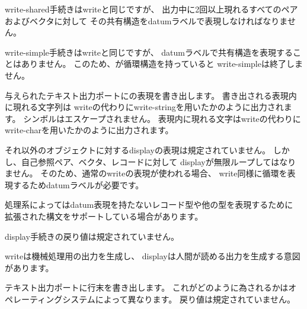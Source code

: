 \begin{entry}{%
}

{\cf write-shared}手続きは{\cf write}と同じですが、
出力中に2回以上現れるすべてのペアおよびベクタに対して
その共有構造をdatumラベルで表現しなければなりません。

\end{entry}

\begin{entry}{%
}

{\cf write-simple}手続きは{\cf write}と同じですが、
datumラベルで共有構造を表現することはありません。
このため、が循環構造を持っていると
{\cf write-simple}は終了しません。

\end{entry}


\begin{entry}{%
}

与えられたテキスト出力ポートにの表現を書き出します。
書き出される表現内に現れる文字列は
{\cf write}の代わりに{\cf write-string}を用いたかのように出力されます。
シンボルはエスケープされません。
表現内に現れる文字は{\cf write}の代わりに
{\cf write-char}を用いたかのように出力されます。

それ以外のオブジェクトに対する{\cf display}の表現は規定されていません。
しかし、自己参照ペア、ベクタ、レコードに対して
{\cf display}が無限ループしてはなりません。
そのため、通常の{\cf write}の表現が使われる場合、
{\cf write}同様に循環を表現するためdatumラベルが必要です。

処理系によってはdatum表現を持たないレコード型や他の型を表現するために
拡張された構文をサポートしている場合があります。

{\cf display}手続きの戻り値は規定されていません。

\begin{rationale}
{\cf write}は機械処理用の出力を生成し、
{\cf display}は人間が読める出力を生成する意図があります。
\end{rationale}
\end{entry}


\begin{entry}{%
}

テキスト出力ポートに行末を書き出します。
これがどのように為されるかはオペレーティングシステムによって異なります。
戻り値は規定されていません。

\end{entry}


